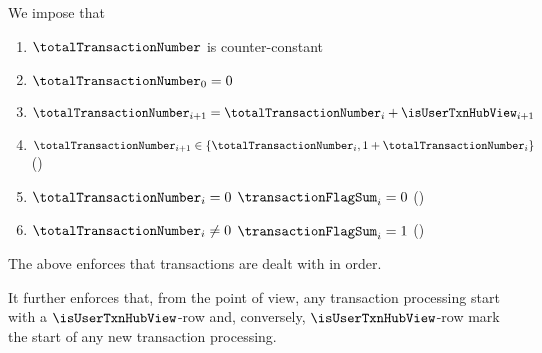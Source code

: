 We impose that
\begin{enumerate}
	\item $\totalTransactionNumber$ is counter-constant
	\item $\totalTransactionNumber _{0} = 0$
	\item $\totalTransactionNumber _{i + 1} = \totalTransactionNumber _{i} + \isUserTxnHubView _{i + 1}$
	\item $\totalTransactionNumber _{i + 1} \in \{ \totalTransactionNumber _{i}, 1 + \totalTransactionNumber _{i} \}$ (\sanityCheck)
	\item \If $\totalTransactionNumber _{i} =    0$ \Then $\transactionFlagSum _{i} = 0$ (\sanityCheck)
	\item \If $\totalTransactionNumber _{i} \neq 0$ \Then $\transactionFlagSum _{i} = 1$ (\sanityCheck)
\end{enumerate}
\saNote{}
The above enforces that transactions are dealt with in order.

\saNote{} \label{user txn data: generalities: total transaction number: transaction processing starts with a HUB row}
It further enforces that,
from the \txnDataMod{} point of view,
any transaction processing start with a $\isUserTxnHubView$-row
and, conversely,
$\isUserTxnHubView$-row mark the start of any new transaction processing.
